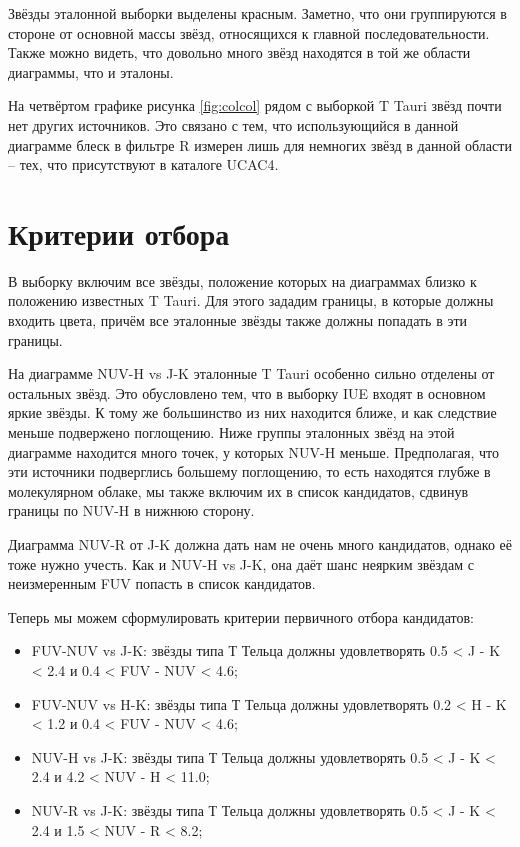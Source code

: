 Звёзды эталонной выборки выделены красным. Заметно, что они группируются в стороне от основной массы звёзд, относящихся к главной последовательности. Также можно видеть, что довольно много звёзд находятся в той же области диаграммы, что и эталоны.

На четвёртом графике рисунка \ref{fig:colcol} рядом с выборкой T Tauri звёзд почти нет других источников. Это связано с тем, что использующийся в данной диаграмме блеск в фильтре R измерен лишь для немногих звёзд в данной области -- тех, что присутствуют в каталоге UCAC4. 

\section{Критерии отбора}

В выборку включим все звёзды, положение которых на диаграммах близко к положению известных T Tauri. Для этого зададим границы, в которые должны входить цвета, причём все эталонные звёзды также должны попадать в эти границы.

На диаграмме NUV-H vs J-K эталонные T Tauri особенно сильно отделены от остальных звёзд. Это обусловлено тем, что в выборку IUE входят в основном яркие звёзды. К тому же большинство из них находится ближе, и как следствие меньше подвержено поглощению. Ниже группы эталонных звёзд на этой диаграмме находится много точек, у которых NUV-H меньше. Предполагая, что эти источники подверглись большему поглощению, то есть находятся глубже в молекулярном облаке, мы также включим их в список кандидатов, сдвинув границы по NUV-H в нижнюю сторону.

Диаграмма NUV-R от J-K должна дать нам не очень много кандидатов, однако её тоже нужно учесть. Как и NUV-H vs J-K, она даёт шанс неярким звёздам с неизмеренным FUV попасть в список кандидатов.

Теперь мы можем сформулировать критерии первичного отбора кандидатов:
\begin{itemize}
	\item FUV-NUV vs J-K: звёзды типа Т Тельца должны удовлетворять 0.5 < J - K < 2.4 и 0.4 < FUV - NUV < 4.6;
	\item	FUV-NUV vs H-K: звёзды типа Т Тельца должны удовлетворять 0.2 < H - K < 1.2 и 0.4 < FUV - NUV < 4.6;
	\item	NUV-H vs J-K: звёзды типа Т Тельца должны удовлетворять 0.5 < J - K < 2.4 и 4.2 < NUV - H < 11.0;
	\item	NUV-R vs J-K: звёзды типа Т Тельца должны удовлетворять 0.5 < J - K < 2.4 и 1.5 < NUV - R < 8.2;
\end{itemize}

